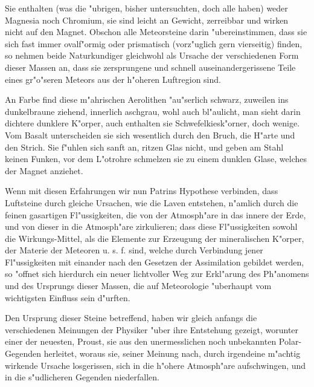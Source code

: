 \documentclass[a4paper, 11pt, oneside, polutonikogreek, german]{article}
\begin{document}
Sie enthalten (was die "ubrigen, bisher untersuchten, doch alle haben) weder Magnesia noch Chromium, sie sind leicht an Gewicht, zerreibbar und wirken nicht auf den Magnet. Obschon alle Meteorsteine darin "ubereinstimmen, dass sie sich fast immer ovalf"ormig oder prismatisch (vorz"uglich gern vierseitig) finden, so nehmen beide Naturkundiger gleichwohl als Ursache der verschiedenen Form dieser Massen an, dass sie zersprungene und schnell auseinandergerissene Teile eines gr"o"seren Meteors aus der h"oheren Luftregion sind.

An Farbe find diese m"ahrischen Aerolithen "au"serlich schwarz, zuweilen ins dunkelbraune ziehend, innerlich aschgrau, wohl auch bl"aulicht, man sieht darin dichtere dunklere K"orper, auch enthalten sie Schwefelkiesk"orner, doch wenige. Vom Basalt unterscheiden sie sich wesentlich durch den Bruch, die H"arte und den Strich. Sie f"uhlen sich sanft an, ritzen Glas nicht, und geben am Stahl keinen Funken, vor dem L"otrohre schmelzen sie zu einem dunklen Glase, welches der Magnet anziehet.

Wenn mit diesen Erfahrungen wir nun Patrins Hypothese verbinden, dass Luftsteine durch gleiche Ursachen, wie die Laven entstehen, n"amlich durch die feinen gasartigen Fl"ussigkeiten, die von der Atmosph"are in das innere der Erde, und von dieser in die Atmosph"are zirkulieren; dass diese Fl"ussigkeiten sowohl die Wirkungs-Mittel, als die Elemente zur Erzeugung der mineralischen K"orper, der Materie der Meteoren u. s. f. sind, welche durch Verbindung jener Fl"ussigkeiten mit einander nach den Gesetzen der Assimilation gebildet werden, so "offnet sich hierdurch ein neuer lichtvoller Weg zur Erkl"arung des Ph"anomens und des Ursprungs dieser Massen, die auf Meteorologie "uberhaupt vom wichtigsten Einfluss sein d"urften.

Den Ursprung dieser Steine betreffend, haben wir gleich anfangs die verschiedenen Meinungen der Physiker "uber ihre Entstehung gezeigt, worunter einer der neuesten, Proust, sie aus den unermesslichen noch unbekannten Polar-Gegenden herleitet, woraus sie, seiner Meinung nach, durch irgendeine m"achtig wirkende Ursache losgerissen, sich in die h"ohere Atmosph"are aufschwingen, und in die s"udlicheren Gegenden niederfallen.
\end{document}
